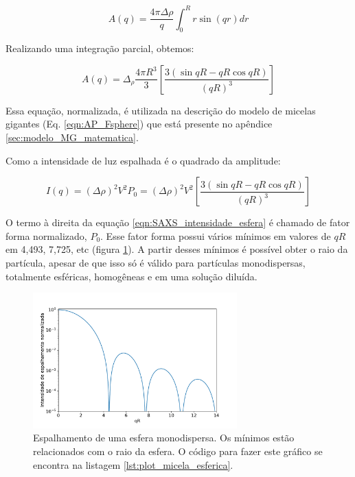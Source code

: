 		\begin{equation}
			A(q) = \dfrac{4\pi\Delta\rho}{q} \int_0^R r\sin(qr) dr
			\label{eqn:SAXS_amplitude_esfera}
		\end{equation}
				
		Realizando uma integração parcial, obtemos:
		
		\begin{equation}
			A(q) = \Delta_\rho \dfrac{4\pi R^3}{3} \left[ \dfrac{3 \left( \sin qR - qR \cos qR \right)}{\left(qR\right)^3} \right]
			\label{eqn:SAXS_amplitude_esfera_integrado}
		\end{equation}
		
		Essa equação, normalizada, é utilizada na descrição do modelo de micelas gigantes (Eq. \ref{eqn:AP_Fsphere}) que está presente no apêndice \ref{sec:modelo_MG_matematica}.
		
		Como a intensidade de luz espalhada é o quadrado da amplitude:
		
		\begin{equation}
			I(q) = (\Delta \rho)^2 V^2 P_0=(\Delta \rho)^2 V^2 \left[ \dfrac{3 \left( \sin qR - qR \cos qR \right)}{\left( qR \right) ^3} \right]
			\label{eqn:SAXS_intensidade_esfera}
		\end{equation}
		
		O termo à direita da equação \ref{eqn:SAXS_intensidade_esfera} é chamado de fator forma normalizado, \(P_0\).  Esse fator forma possui vários mínimos em valores de \(qR\) em 4,493, 7,725, etc (figura \ref{fig:espalhamento_esfera}). A partir desses mínimos é possível obter o raio da partícula, apesar de que isso só é válido para partículas monodispersas, totalmente esféricas, homogêneas e em uma solução diluída.
		
		\begin{figure}[h]
			\centering
			\includegraphics[width=0.7\textwidth]{imagens/saxs/espalhamento_esfera_monodispersa}
			\caption{Espalhamento de uma esfera monodispersa. Os mínimos estão relacionados com o raio da esfera. O código para fazer este gráfico se encontra na listagem \ref{lst:plot_micela_esferica}.}
			\label{fig:espalhamento_esfera}
		\end{figure}
		
